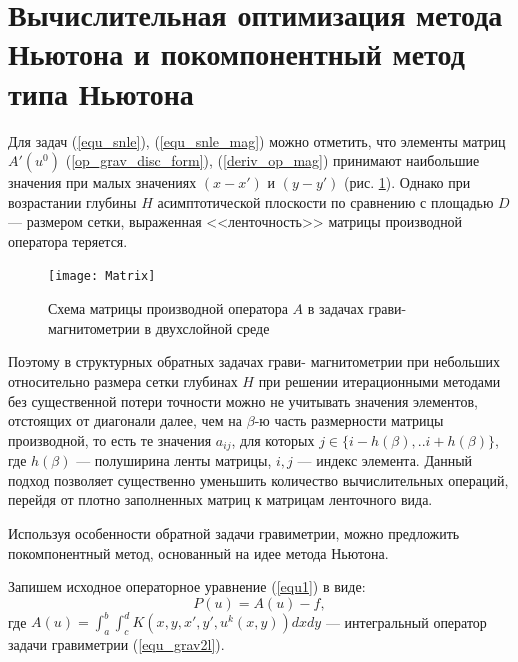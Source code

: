 \newpage
\section{Вычислительная оптимизация метода Ньютона и покомпонентный метод типа Ньютона}

Для задач (\ref{equ_snle}), (\ref{equ_snle_mag}) можно отметить, что элементы матриц $A'(u^0)$ (\ref{op_grav_disc_form}), (\ref{deriv_op_mag}) принимают наибольшие значения при малых значениях $(x-x')$ и $(y-y')$ (рис. \ref{fig:matrixscheme}).
Однако при возрастании глубины $H$ асимптотической плоскости по сравнению с площадью $D$ --- размером сетки, выраженная <<ленточность>> матрицы производной оператора теряется.
\begin{figure}
	\centering
	\texttt{[image: Matrix]}
	\caption{Схема матрицы производной оператора $A$ в задачах грави- магнитометрии в двухслойной среде}
	\label{fig:matrixscheme}
\end{figure}

Поэтому в структурных обратных задачах грави- магнитометрии при небольших относительно размера сетки глубинах $H$ при решении итерационными методами без существенной потери точности можно не учитывать значения элементов, отстоящих от диагонали далее, чем на  $\beta$-ю часть  размерности матрицы производной, то есть те значения $a_{ij}$, для которых  $j \in \{i-h(\beta),..i+h(\beta)\} $, где $h(\beta)$ --- полуширина ленты матрицы, $i, j$ --- индекс элемента. Данный подход позволяет существенно уменьшить количество вычислительных операций, перейдя от плотно заполненных матриц к матрицам ленточного вида.

Используя особенности обратной задачи гравиметрии, можно предложить покомпонентный метод, основанный на идее метода Ньютона.

Запишем исходное операторное уравнение (\ref{equ1}) в виде:
$$P(u)=A(u)-f,$$
где $A(u)=\int_{a}^{b}\int_{c}^{d}K(x,y, x',y',u^k(x,y))dxdy$ --- интегральный оператор задачи гравиметрии (\ref{equ_grav2l}).

